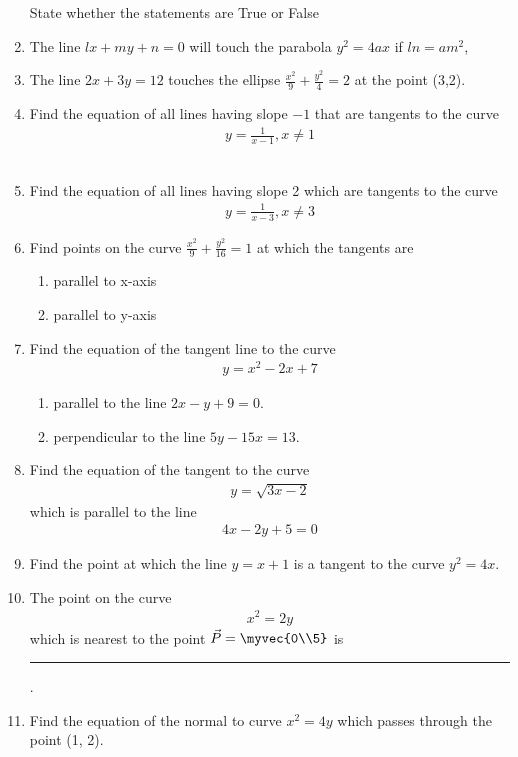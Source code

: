 \begin{enumerate}[label=\thesubsection.\arabic*,ref=\thesubsection.\theenumi]
State whether the statements are True or False 
\item The line $lx+my+n=0$ will touch the parabola $y^2=4 ax$ if $ln =am^2$,
\item The line $2x+3y=12$ touches the ellipse $\frac{x^2}{9}+\frac{y^2}{4}=2$ at the point (3,2).
\item 
Find the equation of all lines having slope  $-1$ that are tangents to the curve
\begin{align}
y = \frac{1}{x-1}, x \neq 1
\label{chapters/12/6/3/10}
\end{align}
	\\
	\solution 

\item 
Find the equation of all lines having slope 2 which are tangents to the curve 
\begin{align}
y=\frac{1}{x-3}, x\neq{3} 
\end{align}
\item 
 Find points on the curve $\frac{x^2}{9}+\frac{y^2}{16}=1$ at which the tangents are 
 \begin{enumerate}
	 \item parallel to x-axis\\  
	 \item parallel to y-axis
 \end{enumerate}
 \solution 
\label{chapters/12/6/3/13}

\item 
Find the equation of the tangent line to the curve
\begin{align}
y=x^2-2x+7
\end{align}
\begin{enumerate}
    \item parallel to the line $2x-y+9=0$.
    \item perpendicular to the line $5y-15x=13$.
\end{enumerate}
\item 
Find the equation of the tangent to the curve 
\begin{align}
	y = \sqrt{3x-2}
\end{align}
which is parallel to the line
\begin{align}
	4x-2y+5 = 0
\end{align}
\item 
Find the point at which the line $y = x + 1$ is a tangent to the curve $y^2 = 4x$.
    \item The point on the curve 
\label{chapters/12/6/5/27}
    \begin{align}
        x^2 = 2y
        \label{eq:chapters/12/6/5/27/curve}
    \end{align}
    which is nearest to the point 
    $\vec{P} = \myvec{0\\5}$ is \rule{1cm}{0.1pt}.
    \\
    \solution 

\item 
Find the equation of the normal to curve $x^2 = 4y$ which passes through the point
(1, 2).
\\
\solution 
\label{chapters/12/6/6/4}

\end{enumerate}

